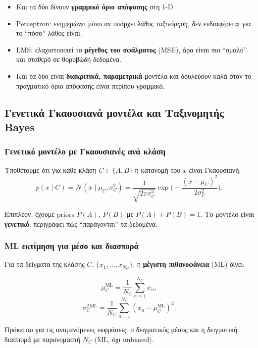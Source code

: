 \documentclass[a4paper,11pt]{article}
\begin{document}
\begin{itemize}
  \item Και τα δύο δίνουν \textbf{γραμμικό όριο απόφασης} στη 1-D.
  \item Perceptron: ενημερώνει μόνο αν υπάρχει \emph{λάθος ταξινόμηση},
        δεν ενδιαφέρεται για το ``πόσο'' λάθος είναι.
  \item LMS: ελαχιστοποιεί το \textbf{μέγεθος του σφάλματος} (MSE),
        άρα είναι πιο ``ομαλό'' και σταθερό σε θορυβώδη δεδομένα.
  \item Και τα δύο είναι \textbf{διακριτικά, παραμετρικά} μοντέλα και
        δουλεύουν καλά όταν το πραγματικό όριο απόφασης είναι περίπου γραμμικό.
\end{itemize}

\subsection{Γενετικά Γκαουσιανά μοντέλα και Ταξινομητής Bayes}

\subsubsection*{Γενετικό μοντέλο με Γκαουσιανές ανά κλάση}

Υποθέτουμε ότι για κάθε κλάση $C\in\{A,B\}$ η κατανομή του $x$ είναι
Γκαουσιανή:
\[
p(x \mid C) = \mathcal{N}(x \mid \mu_C,\sigma_C^2)
  = \frac{1}{\sqrt{2\pi\sigma_C^2}}
    \exp\biggl( -\frac{(x-\mu_C)^2}{2\sigma_C^2} \biggr).
\]

Επιπλέον, έχουμε priors $P(A)$, $P(B)$ με $P(A)+P(B)=1$.
Το μοντέλο είναι \textbf{γενετικό}: περιγράφει πώς ``παράγονται'' τα δεδομένα.

\subsubsection*{ML εκτίμηση για μέσο και διασπορά}

Για τα δείγματα της κλάσης $C$,
$\{x_1,\dots,x_{N_C}\}$, η \textbf{μέγιστη πιθανοφάνεια} (ML) δίνει:

\[
\mu_C^{\text{ML}} = \frac{1}{N_C}\sum_{n=1}^{N_C} x_n,
\]
\[
\sigma_C^{2\,\text{ML}} = \frac{1}{N_C}\sum_{n=1}^{N_C}(x_n - \mu_C^{\text{ML}})^2.
\]

Πρόκειται για τις αναμενόμενες εκφράσεις: ο δειγματικός μέσος και η
δειγματική διασπορά με παρονομαστή $N_C$ (ML, όχι unbiased).
\end{document}
